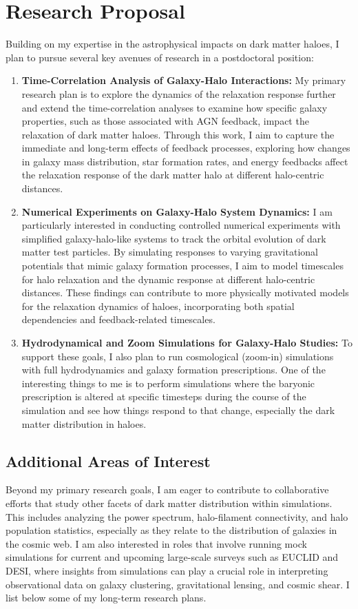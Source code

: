 \documentclass[10pt]{article}
\begin{document}
\section{Research Proposal}
Building on my expertise in the astrophysical impacts on dark matter haloes, I plan to pursue several key avenues of research in a postdoctoral position:

\begin{enumerate}
    \item \textbf{Time-Correlation Analysis of Galaxy-Halo Interactions:} My primary research plan is to explore the dynamics of the relaxation response further and extend the time-correlation analyses to examine how specific galaxy properties, such as those associated with AGN feedback, impact the relaxation of dark matter haloes. Through this work, I aim to capture the immediate and long-term effects of feedback processes, exploring how changes in galaxy mass distribution, star formation rates, and energy feedbacks affect the relaxation response of the dark matter halo at different halo-centric distances.

    \item \textbf{Numerical Experiments on Galaxy-Halo System Dynamics:} I am particularly interested in conducting controlled numerical experiments with simplified galaxy-halo-like systems to track the orbital evolution of dark matter test particles. By simulating responses to varying gravitational potentials that mimic galaxy formation processes, I aim to model timescales for halo relaxation and the dynamic response at different halo-centric distances. These findings can contribute to more physically motivated models for the relaxation dynamics of haloes, incorporating both spatial dependencies and feedback-related timescales.

    \item \textbf{Hydrodynamical and Zoom Simulations for Galaxy-Halo Studies:} To support these goals, I also plan to run cosmological (zoom-in) simulations with full hydrodynamics and galaxy formation prescriptions. One of the interesting things to me is to perform simulations where the baryonic prescription is altered at specific timesteps during the course of the simulation and see how things respond to that change, especially the dark matter distribution in haloes.
\end{enumerate}

\subsection{Additional Areas of Interest}
Beyond my primary research goals, I am eager to contribute to collaborative efforts that study other facets of dark matter distribution within simulations. This includes analyzing the power spectrum, halo-filament connectivity, and halo population statistics, especially as they relate to the distribution of galaxies in the cosmic web. I am also interested in roles that involve running mock simulations for current and upcoming large-scale surveys such as EUCLID and DESI, where insights from simulations can play a crucial role in interpreting observational data on galaxy clustering, gravitational lensing, and cosmic shear. I list below some of my long-term research plans.
\end{document}
